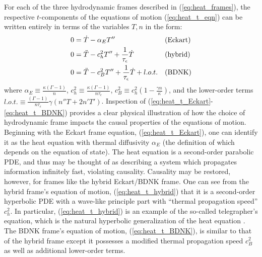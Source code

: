 \documentclass[%
notitlepage,
superscriptaddress,
nofootinbib,
amsmath,
amssymb,
aps,
twocolumn
]{revtex4-1}
\begin{document}
For each of the three hydrodynamic frames described in (\ref{eq:heat_frames}), the respective $t$-components of the equations of motion (\ref{eq:heat_t_eqn}) can be written entirely in terms of the variables $T, n$ in the form:
\begin{align}
0 &= \dot{T} - \alpha_E T'' &&\textnormal{(Eckart)}  \label{eq:heat_t_Eckart} \\
0 &= \ddot{T} - c_h^2 T'' + \frac{1}{\tau_{\epsilon}} \dot{T} &&\textnormal{(hybrid)} \label{eq:heat_t_hybrid} \\
0 &= \ddot{T} - c_B^2 T'' + \frac{1}{\tau_{\epsilon}} \dot{T} + l.o.t. &&\textnormal{(BDNK)} \label{eq:heat_t_BDNK}
\end{align}
where ${\alpha_E \equiv \frac{\kappa (\Gamma - 1)}{n}}$, ${c_h^2 \equiv \frac{\kappa (\Gamma - 1)}{n \tau_{\epsilon}}}$, ${c_B^2 \equiv c_h^2 (1 - \frac{\gamma n}{\kappa})}$, and the 
lower-order terms $l.o.t. \equiv \frac{(\Gamma - 1)}{n \tau_{\epsilon}} \gamma (n'' T + 2 n' T')$.
Inspection of (\ref{eq:heat_t_Eckart}-\ref{eq:heat_t_BDNK}) provides a clear physical illustration of how the choice of hydrodynamic frame impacts the causal properties of the equations of motion.  Beginning with the Eckart frame equation, (\ref{eq:heat_t_Eckart}), one can identify it as the heat equation with thermal diffusivity $\alpha_E$ (the definition of which depends on the equation of state).  The heat equation is a second-order parabolic PDE, and thus may be thought of as describing a system which propagates information infinitely fast, violating causality.  Causality may be restored, however, for frames like the hybrid Eckart/BDNK frame.  One can see from the hybrid frame's equation of motion, (\ref{eq:heat_t_hybrid}) that it is a second-order hyperbolic PDE with a wave-like principle part with ``thermal propagation speed'' $c_h^2$.  In particular, (\ref{eq:heat_t_hybrid}) is an example of the so-called telegrapher's equation, which is the natural hyperbolic generalization of the heat equation \cite{Chester1963}.  The BDNK frame's equation of motion, (\ref{eq:heat_t_BDNK}), is similar to that of the hybrid frame except it possesses a modified thermal propagation speed $c_B^2$ as well as additional lower-order terms.
\end{document}
